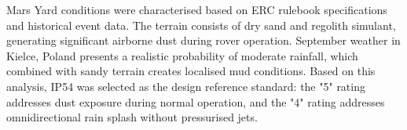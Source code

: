 
Mars Yard conditions were characterised based on ERC rulebook specifications and historical event data. The terrain consists of dry sand and regolith simulant, generating significant airborne dust during rover operation. September weather in Kielce, Poland presents a realistic probability of moderate rainfall, which combined with sandy terrain creates localised mud conditions. Based on this analysis, IP54 was selected as the design reference standard: the "5" rating addresses dust exposure during normal operation, and the "4" rating addresses omnidirectional rain splash without pressurised jets.